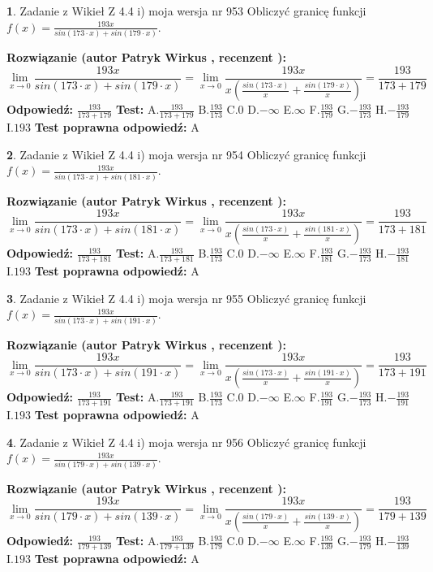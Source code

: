 \documentclass[12pt, a4paper]{article}
\theoremstyle{definition} %
\newtheorem{zad}{}
\newcommand{\zadStart}[1]{\begin{zad}#1\newline}
\newcommand{\zadStop}{\end{zad}}
\newcommand{\rozwStart}[2]{\noindent \textbf{Rozwiązanie (autor #1 , recenzent #2): }\newline}
\newcommand{\rozwStop}{\newline}
\newcommand{\odpStart}{\noindent \textbf{Odpowiedź:}\newline}
\newcommand{\odpStop}{\newline}
\newcommand{\testStart}{\noindent \textbf{Test:}\newline}
\newcommand{\testStop}{\newline}
\newcommand{\kluczStart}{\noindent \textbf{Test poprawna odpowiedź:}\newline}
\newcommand{\kluczStop}{\newline}
\begin{document}
\zadStart{Zadanie z Wikieł Z 4.4 i) moja wersja nr 953}
Obliczyć granicę funkcji $f(x)=\frac{193x}{sin(173\cdot x) +sin(179\cdot x)}$.
\zadStop
\rozwStart{Patryk Wirkus}{}
$$\lim\limits_{x\to 0}\frac{193x}{sin(173\cdot x) +sin(179\cdot x)}=\lim\limits_{x\to 0}\frac{193x}{x(\frac{sin(173\cdot x)}{x}+\frac{sin(179\cdot x)}{x})}=\frac{193}{173+179}$$
\rozwStop
\odpStart
$\frac{193}{173+179}$
\odpStop
\testStart
A.$\frac{193}{173+179}$
B.$\frac{193}{173}$
C.$0$
D.$-\infty$
E.$\infty$
F.$\frac{193}{179}$
G.$-\frac{193}{173}$
H.$-\frac{193}{179}$
I.$193$
\testStop
\kluczStart
A
\kluczStop



\zadStart{Zadanie z Wikieł Z 4.4 i) moja wersja nr 954}
Obliczyć granicę funkcji $f(x)=\frac{193x}{sin(173\cdot x) +sin(181\cdot x)}$.
\zadStop
\rozwStart{Patryk Wirkus}{}
$$\lim\limits_{x\to 0}\frac{193x}{sin(173\cdot x) +sin(181\cdot x)}=\lim\limits_{x\to 0}\frac{193x}{x(\frac{sin(173\cdot x)}{x}+\frac{sin(181\cdot x)}{x})}=\frac{193}{173+181}$$
\rozwStop
\odpStart
$\frac{193}{173+181}$
\odpStop
\testStart
A.$\frac{193}{173+181}$
B.$\frac{193}{173}$
C.$0$
D.$-\infty$
E.$\infty$
F.$\frac{193}{181}$
G.$-\frac{193}{173}$
H.$-\frac{193}{181}$
I.$193$
\testStop
\kluczStart
A
\kluczStop



\zadStart{Zadanie z Wikieł Z 4.4 i) moja wersja nr 955}
Obliczyć granicę funkcji $f(x)=\frac{193x}{sin(173\cdot x) +sin(191\cdot x)}$.
\zadStop
\rozwStart{Patryk Wirkus}{}
$$\lim\limits_{x\to 0}\frac{193x}{sin(173\cdot x) +sin(191\cdot x)}=\lim\limits_{x\to 0}\frac{193x}{x(\frac{sin(173\cdot x)}{x}+\frac{sin(191\cdot x)}{x})}=\frac{193}{173+191}$$
\rozwStop
\odpStart
$\frac{193}{173+191}$
\odpStop
\testStart
A.$\frac{193}{173+191}$
B.$\frac{193}{173}$
C.$0$
D.$-\infty$
E.$\infty$
F.$\frac{193}{191}$
G.$-\frac{193}{173}$
H.$-\frac{193}{191}$
I.$193$
\testStop
\kluczStart
A
\kluczStop



\zadStart{Zadanie z Wikieł Z 4.4 i) moja wersja nr 956}
Obliczyć granicę funkcji $f(x)=\frac{193x}{sin(179\cdot x) +sin(139\cdot x)}$.
\zadStop
\rozwStart{Patryk Wirkus}{}
$$\lim\limits_{x\to 0}\frac{193x}{sin(179\cdot x) +sin(139\cdot x)}=\lim\limits_{x\to 0}\frac{193x}{x(\frac{sin(179\cdot x)}{x}+\frac{sin(139\cdot x)}{x})}=\frac{193}{179+139}$$
\rozwStop
\odpStart
$\frac{193}{179+139}$
\odpStop
\testStart
A.$\frac{193}{179+139}$
B.$\frac{193}{179}$
C.$0$
D.$-\infty$
E.$\infty$
F.$\frac{193}{139}$
G.$-\frac{193}{179}$
H.$-\frac{193}{139}$
I.$193$
\testStop
\kluczStart
A
\kluczStop
\end{document}
